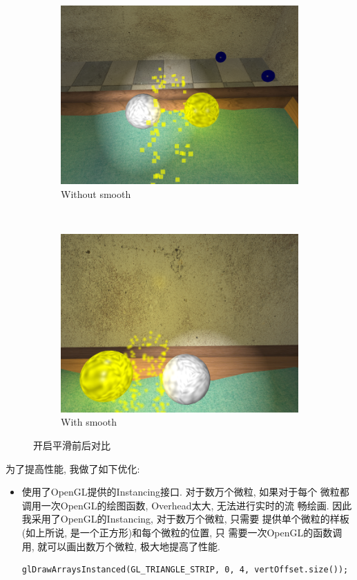 \documentclass[11pt]{article}
\begin{document}
\begin{itemize}
\begin{figure}[h]
\begin{subfigure}[b]{0.4\textwidth}
\includegraphics[width=\textwidth]{without-smooth.png}
\caption{Without smooth}
\label{fig:without-smooth}
\end{subfigure}
~
\begin{subfigure}[b]{0.4\textwidth}
\includegraphics[width=\textwidth]{with-smooth.png}
\caption{With smooth}
\label{fig:with-smooth}
\end{subfigure}

\caption{开启平滑前后对比} \label{fig:smooth}
\end{figure}
\end{itemize}
为了提高性能, 我做了如下优化:
\begin{itemize}
\item 使用了OpenGL提供的Instancing接口. 对于数万个微粒, 如果对于每个
微粒都调用一次OpenGL的绘图函数, Overhead太大, 无法进行实时的流
畅绘画. 因此我采用了OpenGL的Instancing, 对于数万个微粒, 只需要
提供单个微粒的样板(如上所说, 是一个正方形)和每个微粒的位置, 只
需要一次OpenGL的函数调用, 就可以画出数万个微粒, 极大地提高了性能.
\begin{verbatim}
glDrawArraysInstanced(GL_TRIANGLE_STRIP, 0, 4, vertOffset.size());
\end{verbatim}
\end{itemize}
\end{document}
